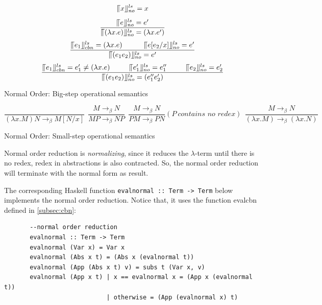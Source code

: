\begin{equation*}
\llceil x \rrfloor ^{ls} _{no} = x
\end{equation*}
\begin{equation*}
\frac{\llceil e \rrfloor ^{ls} _{no} = e'}{\llceil (\lambda x.e) \rrfloor ^{ls} _{no} = (\lambda x.e')}
\end{equation*}
\begin{equation*}
\frac{\llceil e_1 \rrfloor ^{ls} _{cbn} = (\lambda x.e)\ \ \ \ \ \ \ \ \ \llceil e[e_2/x] \rrfloor ^{ls} _{no} = e'}{\llceil (e_1e_2) \rrfloor ^{ls} _{no} = e'}
\end{equation*}
\begin{equation*}
\frac{\llceil e_1 \rrfloor ^{ls} _{cbn} = e'_1\neq (\lambda x.e)\ \ \ \ \ \ \ \ \llceil e'_1 \rrfloor ^{ls} _{no} = e''_1\ \ \ \ \ \ \ \ \llceil e_2 \rrfloor ^{ls} _{no} = e'_2}{\llceil (e_1e_2) \rrfloor ^{ls} _{no} = (e''_1e'_2)}
\end{equation*}

\begin{center}
Normal Order: Big-step operational semantics
\end{center}

\begin{equation*}
\frac{}{(\lambda x.M)N \rightarrow _\beta M[N/x]}\ \  
\frac{M \rightarrow _\beta N}{MP \rightarrow _\beta NP}\ \ 
\frac{M \rightarrow _\beta N}{PM \rightarrow _\beta PN}(P\ \textit{contains no redex})\ \ 
\frac{M \rightarrow _\beta N}{(\lambda x.M) \rightarrow _\beta (\lambda x.N)}
\end{equation*}
\begin{center}
Normal Order: Small-step operational semantics
\end{center}

Normal order reduction is \textit{normalizing}, since it reduces the $\lambda$-term until there is no redex, redex in abstractions is also contracted. So, the normal order reduction will terminate with the normal form as result. 

The corresponding Haskell function \verb|evalnormal :: Term -> Term| below implements the normal order reduction. Notice that, it uses the function evalcbn defined in \ref{subsec:cbn}:

\begin{verbatim}
       --normal order reduction
       evalnormal :: Term -> Term
       evalnormal (Var x) = Var x
       evalnormal (Abs x t) = (Abs x (evalnormal t))
       evalnormal (App (Abs x t) v) = subs t (Var x, v)
       evalnormal (App x t) | x == evalnormal x = (App x (evalnormal t))
                            | otherwise = (App (evalnormal x) t)
\end{verbatim}

